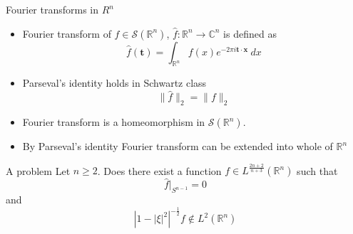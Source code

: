 \documentclass[compress]{beamer}
\newcommand{\R}{\mathbb R}
\newcommand{\C}{\mathbb C}
\begin{document}
\begin{frame}{Fourier transforms in $R^n$}
  \begin{itemize}
    \item Fourier transform of $f \in \mathscr{S}(\R^n)$, $\hat{f} : \R^n \to \C^n$ is defined as $$\hat{f}( \textbf{t} ) = \int_{\R^n} f(x)e^{-2 \pi i \textbf{t} \cdot \textbf{x}} \ dx$$
    \item Parseval's identity holds in Schwartz class $$\|\hat{f}\|_2 = \|f\|_2$$
    \item Fourier transform is a homeomorphism in $\mathscr{S}(\R^n)$.
    \item By Parseval's identity Fourier transform can be extended into whole of $\R^n$
  \end{itemize}
\end{frame}

\begin{frame}{A problem}
  Let $n \ge 2$. Does there exist a function $f \in L^{\frac{2n+2}{n+3}}(\R^n)$ such that $$\hat{f}\vert_{S^{n-1}} = 0$$
and
$$\left| 1 - |\xi|^2\right|^{-\frac{1}{2}}f \notin L^2(\R^n)$$
\end{frame}
\end{document}
